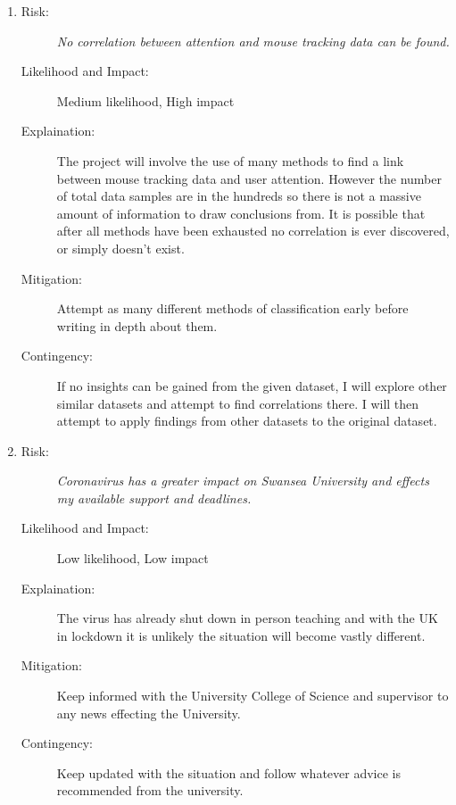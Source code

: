 \documentclass{article}
\begin{document}
\begin{enumerate}
    \item 
    \begin{description}
        \item[Risk:]    
        \emph{No correlation between attention and mouse tracking data can be found.}    
        \item[Likelihood and Impact:]
        Medium likelihood, High impact
        \item[Explaination:]
        The project will involve the use of many methods to find a link between mouse tracking data and user attention.
        However the number of total data samples are in the hundreds so there is not a massive amount of information to draw conclusions from.
        It is possible that after all methods have been exhausted no correlation is ever discovered, or simply doesn't exist. 
        \item[Mitigation:]
        Attempt as many different methods of classification early before writing in depth about them.  
        \item[Contingency:]
        If no insights can be gained from the given dataset, I will explore other similar datasets and attempt to find correlations there.
        I will then attempt to apply findings from other datasets to the original dataset. 
    \end{description}

    \item 
    \begin{description}
        \item[Risk:]    
        \emph{Coronavirus has a greater impact on Swansea University and effects my available support and deadlines.}
        \item[Likelihood and Impact:]
        Low likelihood, Low impact
        \item[Explaination:]
        The virus has already shut down in person teaching and with the UK in lockdown it is unlikely the situation will become vastly different. 
        \item[Mitigation:]
        Keep informed with the University College of Science and supervisor to any news effecting the University.
        \item[Contingency:]
        Keep updated with the situation and follow whatever advice is recommended from the university.
    \end{description}

\end{enumerate}
\end{document}
